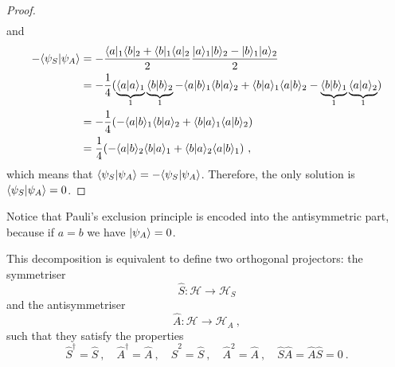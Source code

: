 \begin{proof}
\begin{equation*}
\begin{aligned}
    \end{aligned}
    \end{equation*}
    and 
    \begin{equation*}
    \begin{aligned}
        - \langle\psi_S\vert\psi_A\rangle & = - \frac{\langle a\vert_1\langle b\vert_2 + \langle b\vert_1\langle a\vert_2}{2} \frac{\vert a\rangle_1 \vert b\rangle_2 - \vert b\rangle_1 \vert a\rangle_2}{2} \\ & = - \frac{1}{4} (\underbrace{\langle a\vert a\rangle_1}_1 \underbrace{\langle b\vert b\rangle_2}_1 - \langle a\vert b\rangle_1 \langle b\vert a\rangle_2 + \langle b\vert a\rangle_1 \langle a\vert b\rangle_2 - \underbrace{\langle b\vert b\rangle_1}_1 \underbrace{\langle a\vert a\rangle_2}_1) \\ & = - \frac{1}{4} (- \langle a\vert b\rangle_1 \langle b\vert a\rangle_2 + \langle b\vert a\rangle_1 \langle a\vert b\rangle_2) \\ & = \frac{1}{4} (- \langle a\vert b\rangle_2 \langle b\vert a\rangle_1 + \langle b\vert a\rangle_2 \langle a\vert b\rangle_1 ) ~,
    \end{aligned}
    \end{equation*}
    which means that $\langle\psi_S\vert\psi_A\rangle = - \langle\psi_S\vert\psi_A\rangle$. Therefore, the only solution is $\langle\psi_S\vert\psi_A\rangle = 0$.
    \end{proof}
    
    Notice that Pauli's exclusion principle is encoded into the antisymmetric part, because if $a = b$ we have $\vert\psi_A\rangle = 0$.

    This decomposition is equivalent to define two orthogonal projectors: the symmetriser 
    \begin{equation*}
        \hat S \colon \mathcal H \rightarrow \mathcal H_S
    \end{equation*}
    and the antisymmetriser 
    \begin{equation*}
        \hat A \colon \mathcal H \rightarrow \mathcal H_A ~,
    \end{equation*}
    such that they satisfy the properties 
    \begin{equation}\label{projprop}
        \hat S^\dagger = \hat S~, \quad \hat A^\dagger = \hat A~, \quad \hat S^2 = \hat S~, \quad \hat A^2 = \hat A~, \quad \hat S \hat A = \hat A \hat S = 0 ~.
    \end{equation}

